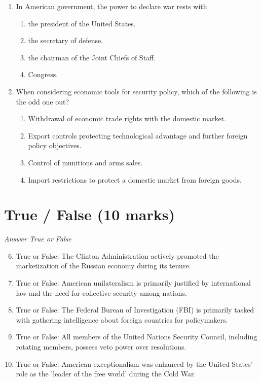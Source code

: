 \documentclass[12pt]{article}
\begin{document}
\begin{enumerate}[label=\arabic*.]
\item In American government, the power to declare war rests with
\begin{enumerate}[label=(\alph*)]
    \item the president of the United States.
    \item the secretary of defense.
    \item the chairman of the Joint Chiefs of Staff.
    \item Congress.
\end{enumerate}
\item When considering economic tools for security policy, which of the following is the odd one out?
\begin{enumerate}[label=(\alph*)]
    \item Withdrawal of economic trade rights with the domestic market.
    \item Export controls protecting technological advantage and further foreign policy objectives.
    \item Control of munitions and arms sales.
    \item Import restrictions to protect a domestic market from foreign goods.
\end{enumerate}
\end{enumerate}

\section*{True / False (10 marks)}
\textit{Answer True or False}
\begin{enumerate}[label=\arabic*.]
\setcounter{enumi}{5}
\item True or False: The Clinton Administration actively promoted the marketization of the Russian economy during its tenure.
\item True or False: American unilateralism is primarily justified by international law and the need for collective security among nations.
\item True or False: The Federal Bureau of Investigation (FBI) is primarily tasked with gathering intelligence about foreign countries for policymakers.
\item True or False: All members of the United Nations Security Council, including rotating members, possess veto power over resolutions.
\item True or False: American exceptionalism was enhanced by the United States' role as the 'leader of the free world' during the Cold War.
\end{enumerate}
\end{document}
